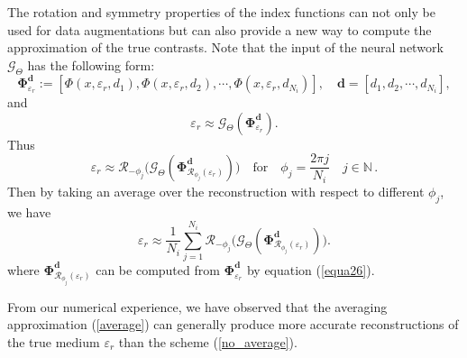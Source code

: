 \documentclass{article}
\begin{document}
The rotation and symmetry properties of the index functions can not only be used for data augmentations but can also provide a new way to compute the approximation of the true contrasts. Note that the input of the neural network $\mathcal{G}_{\Theta}$ has the following form:
\begin{equation}
    \mathbf{\Phi}^{\mathbf{d}}_{\varepsilon_{r}}:=[\Phi(x,\varepsilon_{r},d_1),\Phi(x,\varepsilon_{r},d_2),\cdots,\Phi(x,\varepsilon_{r},d_{N_i})], \quad \mathbf{d}=[d_1,d_2,\cdots,d_{N_i}],
\end{equation}
and 
\begin{equation}
	\varepsilon_{r}\approx\mathcal{G}_{\Theta}(\mathbf{\Phi}^{\mathbf{d}}_{\varepsilon_{r}}).
	\label{no_average}
\end{equation}
Thus
\begin{equation}
	\varepsilon_{r}\approx \mathcal{R}_{- \phi_{j}}\bigg(\mathcal{G}_{\Theta}(\mathbf{\Phi}^{\mathbf{d}}_{\mathcal{R}_{\phi_j}(\varepsilon_{r})})\bigg) \quad \text{for}\quad \phi_j=\frac{2\pi j}{N_i} \quad  j\in \mathbb{N}\,.
\end{equation}
Then by taking an average over the reconstruction with respect to different $\phi_j$, we have
\begin{equation}
	\varepsilon_{r}\approx\frac{1}{N_i}\sum_{j=1}^{N_i}\mathcal{R}_{- \phi_{j}}\bigg(\mathcal{G}_{\Theta}(\mathbf{\Phi}^{\mathbf{d}}_{\mathcal{R}_{\phi_j}(\varepsilon_{r})})\bigg).
	\label{average}
\end{equation}
where $\mathbf{\Phi}^{\mathbf{d}}_{\mathcal{R}_{\phi_j}(\varepsilon_{r})}$ can be computed from $\mathbf{\Phi}^{\mathbf{d}}_{\varepsilon_{r}}$ by equation (\ref{equa26}). 

From our numerical experience, we have observed that 
the averaging approximation (\ref{average}) can generally produce more accurate 
reconstructions of the true medium $\varepsilon_{r}$ than the scheme (\ref{no_average}). 
\end{document}
